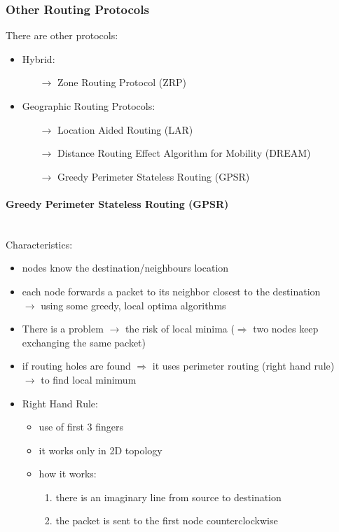 \subsubsection{Other Routing Protocols}
There are other protocols:
\begin{itemize}
    \item Hybrid:
    \begin{itemize}
        \item[$\rightarrow$] Zone Routing Protocol (ZRP)
    \end{itemize}
    \item Geographic Routing Protocols:
    \begin{itemize}
        \item[$\rightarrow$] Location Aided Routing (LAR)
        \item[$\rightarrow$] Distance Routing Effect Algorithm for Mobility (DREAM)
        \item[$\rightarrow$] Greedy Perimeter Stateless Routing (GPSR)
    \end{itemize}
\end{itemize}

\paragraph{Greedy Perimeter Stateless Routing (GPSR)}\mbox{}\\[0.2cm]
Characteristics:
\begin{itemize}
    \item nodes know the destination/neighbours location
    \item each node forwards a packet to its neighbor closest to the destination\\
    $\rightarrow$ using some greedy, local optima algorithms
    \item There is a problem $\rightarrow$ the risk of
    local minima ($\Rightarrow$ two nodes keep exchanging the same packet)
    \item if routing holes are found $\Rightarrow$ it uses perimeter routing (right hand rule)\\
    $\rightarrow$ to find local minimum
    \item Right Hand Rule:
    \begin{itemize}
        \item use of first 3 fingers
        \item it works only in 2D topology
        \item how it works:
        \begin{enumerate}
            \item there is an imaginary line from source to destination
            \item the packet is sent to the first node counterclockwise
        \end{enumerate}
    \end{itemize}
\end{itemize}